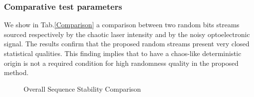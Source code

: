 \subsubsection{Comparative test parameters}

We show in Tab.\ref{Comparison} a comparison between two random bits
streams sourced respectively by the chaotic laser intensity and by the
noisy optoelectronic signal. The results confirm that the proposed
random streams present very closed statistical qualities. This finding
implies that to have a chaos-like deterministic origin is not a
required condition for high randomness quality
in the proposed method.

\begin{figure}
  \centering {}
  \hspace{0.5cm}
  \caption{Overall Sequence Stability Comparison}
  \label{fig:Comparison2}
\end{figure}

